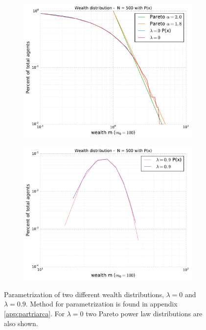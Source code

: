 \documentclass[10pt, a4paper]{amsart}
\begin{document}
\begin{figure}
\begin{subfigure}{.5\textwidth}
  \centering
  \includegraphics[width=\linewidth]{../figures/5ac/5c_parameterization0.pdf}
  \caption{}
  \label{fig:paramfig1}
\end{subfigure}%
\begin{subfigure}{.5\textwidth}
  \centering
  \includegraphics[width=\linewidth]{../figures/5ac/5c_parameterization09.pdf}
  \caption{}
  \label{fig:paramfig2}
\end{subfigure}
\caption{Parametrization of two different wealth distributions, $\lambda=0$ and $\lambda=0.9$. Method for parametrization is found in appendix \ref{app:partriarca}. For $\lambda=0$ two Pareto power law distributions are also shown.}
\label{fig:paramfig}
\end{figure}
\end{document}
